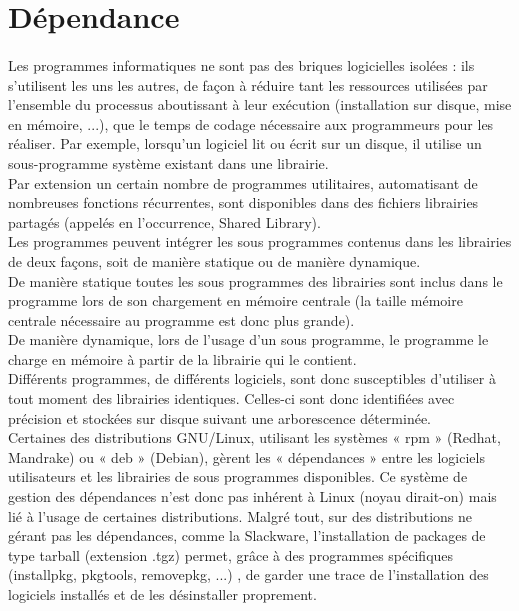 \documentclass[a4paper,12pt]{article}
\begin{document}
\section{Dépendance}
\paragraph{}
Les programmes informatiques ne sont pas des briques logicielles isolées : ils s’utilisent les uns les autres, de façon
à réduire tant les ressources utilisées par l’ensemble du processus aboutissant à leur exécution (installation sur disque, mise en mémoire, ...), 
que le temps de codage nécessaire aux programmeurs pour les réaliser. Par exemple, lorsqu’un logiciel lit ou écrit sur un disque, 
il utilise un sous-programme système existant dans une librairie.\\

Par extension un certain nombre de programmes utilitaires, automatisant de nombreuses fonctions récurrentes, 
sont disponibles dans des fichiers librairies partagés (appelés en l’occurrence, Shared Library).\\

Les programmes peuvent intégrer les sous programmes contenus dans les librairies de deux façons, soit de manière statique ou de manière dynamique.\\

De manière statique toutes les sous programmes des librairies sont inclus dans le programme lors de son chargement en mémoire centrale 
(la taille mémoire centrale nécessaire au programme est donc plus grande).\\

De manière dynamique, lors de l’usage d’un sous programme, le programme le charge en mémoire à partir de la librairie qui le contient.\\

Différents programmes, de différents logiciels, sont donc susceptibles d’utiliser à tout moment des librairies identiques. 
Celles-ci sont donc identifiées avec précision  et stockées sur disque suivant une arborescence déterminée.\\

Certaines des distributions GNU/Linux, utilisant les systèmes « rpm » (Redhat, Mandrake) ou « deb » (Debian), gèrent 
les « dépendances » entre les logiciels utilisateurs et les librairies de sous programmes disponibles. 
Ce système de gestion des dépendances n’est donc pas inhérent à Linux (noyau dirait-on) mais lié à l’usage de certaines distributions. 
Malgré tout, sur des distributions ne gérant pas les dépendances, comme la Slackware, l’installation de packages de type tarball (extension .tgz)
permet, grâce à des programmes spécifiques (installpkg, pkgtools, removepkg, ...) , de garder une trace de l’installation des logiciels installés 
et de les désinstaller proprement.\\
\end{document}
